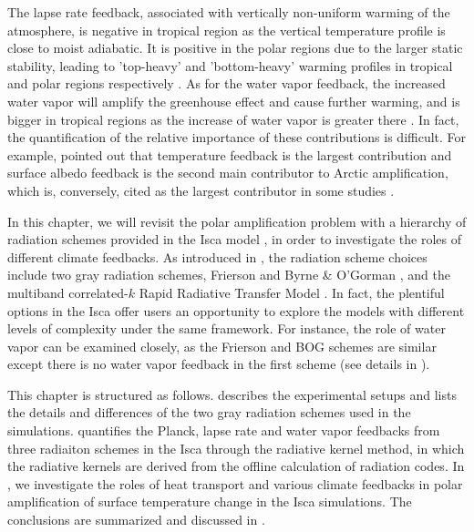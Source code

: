 The lapse rate feedback, associated with vertically non-uniform warming of the atmosphere, is negative in tropical region as the vertical temperature profile is close to moist adiabatic. It is positive in the polar regions due to the larger static stability, leading to 'top-heavy' and 'bottom-heavy' warming profiles in tropical and polar regions respectively \citep{Graversen2009, Pithan2014, Manabe1975, Kim2018}. As for the water vapor feedback, the increased water vapor will amplify the greenhouse effect and cause further warming, and is bigger in tropical regions as the increase of water vapor is greater there \citep{Taylor2013, Pithan2014}. In fact, the quantification of the relative importance of these contributions is difficult. For example, \cite{Pithan2014} pointed out that temperature feedback is the largest contribution and surface albedo feedback is the second main contributor to Arctic amplification, which is, conversely, cited as the largest contributor in some studies \citep[e.g.,][]{Manabe1975,Winton2006amplified,Hall2004}.


In this chapter, we will revisit the polar amplification problem with a hierarchy of radiation schemes provided in the Isca model \citep{Vallis2018}, in order to investigate the roles of different climate feedbacks. As introduced in , the radiation scheme choices include two gray radiation schemes, Frierson \citep{Frierson2006} and Byrne \& O'Gorman \citep[BOG hereafter;][]{Byrne2013}, and the multiband correlated-$k$ Rapid Radiative Transfer Model \citep[RRTM;][]{Clough2005}. In fact, the plentiful options in the Isca offer users an opportunity to explore the models with different levels of complexity under the same framework. For instance, the role of water vapor can be examined closely, as the Frierson and BOG schemes are similar except there is no water vapor feedback in the first scheme (see details in ).

This chapter is structured as follows.  describes the experimental setups and lists the details and differences of the two gray radiation schemes used in the simulations.  quantifies the Planck, lapse rate and water vapor feedbacks from three radiaiton schemes in the Isca through the radiative kernel method, in which the radiative kernels are derived from the offline calculation of radiation codes. In , we investigate the roles of heat transport and various climate feedbacks in polar amplification of surface temperature change in the Isca simulations. The conclusions are summarized and discussed in .

